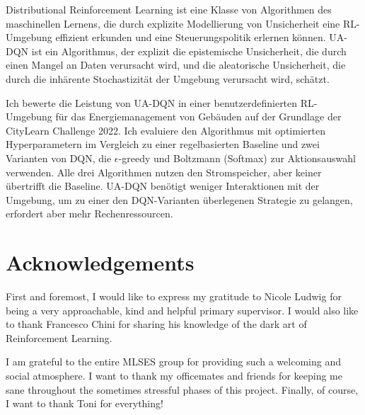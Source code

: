 \documentclass[oneside,12pt,a4paper]{report}
\begin{document}
Distributional Reinforcement Learning ist eine Klasse von Algorithmen des maschinellen Lernens, die durch explizite Modellierung von Unsicherheit eine RL-Umgebung effizient erkunden und eine Steuerungspolitik erlernen können.
UA-DQN ist ein Algorithmus, der explizit die epistemische Unsicherheit, die durch einen Mangel an Daten verursacht wird, und die aleatorische Unsicherheit, die durch die inhärente Stochastizität der Umgebung verursacht wird, schätzt.

Ich bewerte die Leistung von UA-DQN in einer benutzerdefinierten RL-Umgebung für das Energiemanagement von Gebäuden auf der Grundlage der CityLearn Challenge 2022.
Ich evaluiere den Algorithmus mit optimierten Hyperparametern im Vergleich zu einer regelbasierten Baseline und zwei Varianten von DQN, die $\epsilon$-greedy und Boltzmann (Softmax) zur Aktionsauswahl verwenden.
Alle drei Algorithmen nutzen den Stromspeicher, aber keiner übertrifft die Baseline.
UA-DQN benötigt weniger Interaktionen mit der Umgebung, um zu einer den DQN-Varianten überlegenen Strategie zu gelangen, erfordert aber mehr Rechenressourcen.

\newpage
\section*{Acknowledgements}
First and foremost, I would like to express my gratitude to Nicole Ludwig for being a very approachable, kind and helpful primary supervisor.
I would also like to thank Francesco Chini for sharing his knowledge of the dark art of Reinforcement Learning.

I am grateful to the entire MLSES group for providing such a welcoming and social atmosphere.
I want to thank my officemates and friends for keeping me sane throughout the sometimes stressful phases of this project.
Finally, of course, I want to thank Toni for everything!

\cleardoublepage


\renewcommand{\baselinestretch}{1.3}
\small\normalsize

\tableofcontents

\renewcommand{\baselinestretch}{1}
\small\normalsize

\cleardoublepage

\end{document}
